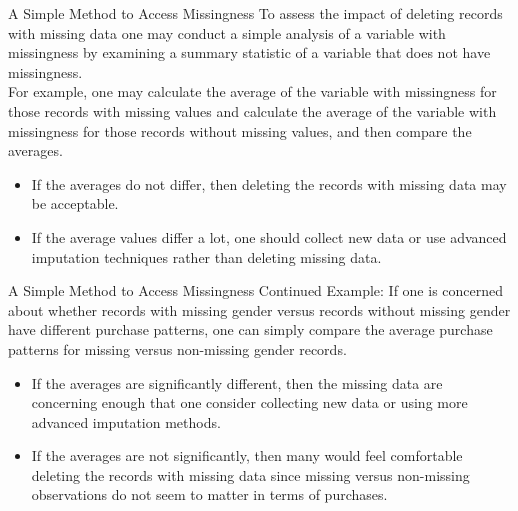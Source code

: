 \documentclass[pdf]{beamer}
\theoremstyle{remark}
\theoremstyle{definition}
\begin{document}
\begin{frame}[t]{A Simple Method to Access Missingness}
To assess the impact of deleting records with missing data one may conduct a simple analysis of a variable with missingness by examining a summary statistic of a variable that does not have missingness. \\
\vspace{1.5ex}
For example, one may calculate the average of the variable with missingness for those records with missing values and calculate the average of the variable with missingness for those records without missing values, and then compare the averages. \\
\vspace{1.5ex} 
\begin{itemize}
  \item If the averages do not differ, then deleting the records with missing data may be acceptable. 
  \item If the average values differ a lot, one should collect new data or use advanced imputation techniques rather than deleting missing data.
\end{itemize}
\end{frame}

\begin{frame}[t]{A Simple Method to Access Missingness Continued}
Example:  If one is concerned about whether records with missing gender versus records without missing gender have different purchase patterns, one can simply compare the average purchase patterns for missing versus non-missing gender records. \\
\vspace{1.5ex}
\begin{itemize}
\item If the averages are significantly different, then the missing data are concerning enough that one consider collecting new data or using more advanced imputation methods. 
\item If the averages are not significantly, then many would feel comfortable deleting the records with missing data since missing versus non-missing observations do not seem to matter in terms of purchases.
\end{itemize}
\end{frame}
\end{document}
